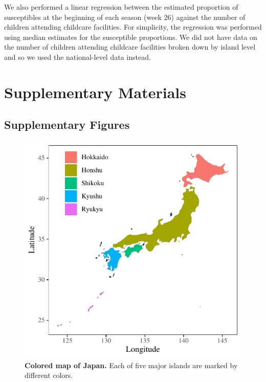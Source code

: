 \documentclass[12pt]{article}
\begin{document}
We also performed a linear regression between the estimated proportion of susceptibles at the beginning of each season (week 26) against the number of children attending childcare facilities.
For simplicity, the regression was performed using median estimates for the susceptible proportions.
We did not have data on the number of children attending childcare facilities broken down by island level and so we used the national-level data instead.

\pagebreak

\setcounter{figure}{0}
\setcounter{equation}{0}
\renewcommand{\thefigure}{S\arabic{figure}}
\renewcommand{\theequation}{S\arabic{equation}}

\section*{Supplementary Materials}

\subsection*{Supplementary Figures}


\begin{figure}[!th]
\includegraphics[width=\textwidth]{../figure/figure_map.pdf}
\caption{
\textbf{Colored map of Japan.}
Each of five major islands are marked by different colors.
}
\end{figure}
\end{document}

